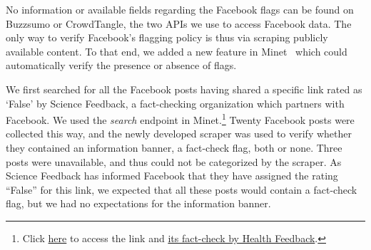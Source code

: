 \documentclass{article}
\begin{document}
No information or available fields regarding the Facebook flags can be found on Buzzsumo or CrowdTangle, the two APIs we use to access Facebook data. The only way to verify Facebook’s flagging policy is thus via scraping publicly available content. To that end, we added a new feature in Minet~\cite{minet} which could automatically verify the presence or absence of flags.

We first searched for all the Facebook posts having shared a specific link rated as ‘False’ by Science Feedback, a fact-checking organization which partners with Facebook. We used the {\it search} endpoint in Minet.\footnote{ Click \href{https://beforeitsnews.com/eu/2021/04/stay-away-from-the-vaxxed-it-is-official-from-pfizers-own-documents-2671454.html}{here} to access the link and  \href{https://healthfeedback.org/claimreview/insufficient-evidence-to-claim-covid-19-vaccines-cause-menstrual-irregularities-in-vaccinated-women-vaccinated-people-arent-making-unvaccinated-people-ill/}{its fact-check by Health Feedback}.} 
Twenty Facebook posts were collected this way, and the newly developed scraper was used to verify whether they contained an information banner, a fact-check flag, both or none. Three posts were unavailable, and thus could not be categorized by the scraper. As Science Feedback has informed Facebook that they have assigned the rating ``False'' for this link, we expected that all these posts would contain a fact-check flag, but we had no expectations for the information banner. 

\end{document}

